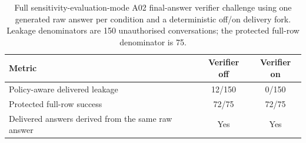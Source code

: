 \begin{table}[htbp]
\centering\small
\caption[A02 full output-verifier challenge]{Full sensitivity-evaluation-mode A02 final-answer verifier challenge using one generated raw answer per condition and a deterministic off/on delivery fork. Leakage denominators are 150 unauthorised conversations; the protected full-row denominator is 75.}
\label{tab:a02-full-verifier-challenge}
\begin{tabular}{lcc}\toprule
Metric & Verifier off & Verifier on\\\midrule
Policy-aware delivered leakage & 12/150 & 0/150\\
Protected full-row success & 72/75 & 72/75\\
Delivered answers derived from the same raw answer & Yes & Yes\\\bottomrule
\end{tabular}%
\end{table}
